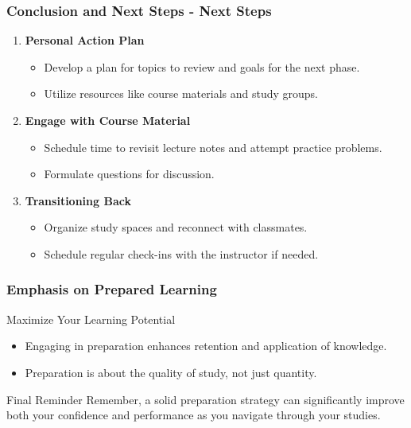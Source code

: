 \documentclass[aspectratio=169]{beamer}
\begin{document}
\begin{frame}[fragile]
  \frametitle{Conclusion and Next Steps - Next Steps}
  \begin{enumerate}
    \item \textbf{Personal Action Plan}
    \begin{itemize}
        \item Develop a plan for topics to review and goals for the next phase.
        \item Utilize resources like course materials and study groups.
    \end{itemize}

    \item \textbf{Engage with Course Material}
    \begin{itemize}
        \item Schedule time to revisit lecture notes and attempt practice problems.
        \item Formulate questions for discussion.
    \end{itemize}

    \item \textbf{Transitioning Back}
    \begin{itemize}
        \item Organize study spaces and reconnect with classmates.
        \item Schedule regular check-ins with the instructor if needed.
    \end{itemize}
  \end{enumerate}
\end{frame}

\begin{frame}[fragile]
  \frametitle{Emphasis on Prepared Learning}
  \begin{block}{Maximize Your Learning Potential}
    \begin{itemize}
        \item Engaging in preparation enhances retention and application of knowledge.
        \item Preparation is about the quality of study, not just quantity.
    \end{itemize}
  \end{block}
  
  \begin{block}{Final Reminder}
    Remember, a solid preparation strategy can significantly improve both your confidence and performance as you navigate through your studies.
  \end{block}
\end{frame}
\end{document}
